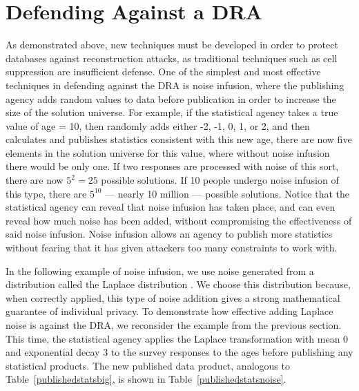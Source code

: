 \documentclass[runningheads]{llncs}
\begin{document}
\section{Defending Against a DRA}
As demonstrated above, new techniques must be developed in
order to protect databases against reconstruction attacks, as traditional techniques such as cell suppression are insufficient defense. One of the simplest and most effective techniques in defending against the DRA is noise infusion, where the publishing agency adds random values to data before publication in order to increase the size of the solution universe. For example, if the statistical agency takes a true value of age = 10, then randomly adds either -2, -1, 0, 1, or 2, and then calculates and publishes statistics consistent with this new age, there are now five elements in the solution universe for this value, where without noise infusion there would be only one. If two responses are processed with noise of this sort, there are now $5^2 = 25$ possible solutions. If 10 people undergo noise infusion of this type, there are $5^{10}$ --- nearly 10 million --- possible solutions. Notice that the statistical agency can reveal that noise infusion has taken place, and can even reveal how much noise has been added, without compromising the effectiveness of said noise infusion. Noise infusion allows an agency to publish more statistics without fearing that it has given attackers too many constraints to work with.

In the following example of noise infusion, we use noise generated
from a distribution called the Laplace distribution
\cite{Dwork:2006:CNS:2180286.2180305}. We choose this distribution
because, when correctly applied, this type of noise addition gives a
strong mathematical guarantee of individual privacy. To demonstrate
how effective adding Laplace noise is against the DRA, we reconsider
the example from the previous section. This time, the statistical
agency applies the Laplace transformation with mean 0 and exponential
decay 3 to the survey responses to the ages before publishing any
statistical products. The new published data product, analogous to
Table~\ref{publishedstatsbig}, is shown in
Table~\ref{publishedstatsnoise}.
\end{document}
